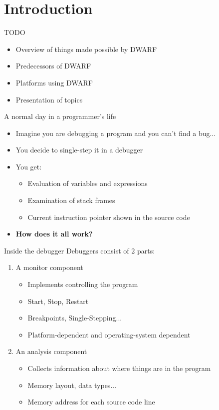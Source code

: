 
\section{Introduction}


\begin{frame}{TODO}
\begin{itemize}
\item Overview of things made possible by DWARF
\item Predecessors of DWARF
\item Platforms using DWARF
\item Presentation of topics
\end{itemize}
\end{frame}


\begin{frame}{A normal day in a programmer's life}
\begin{itemize}
\item Imagine you are debugging a program and you can't find a bug...
\item You decide to single-step it in a \alert{debugger}
\item You get:
	\begin{itemize}
	\item Evaluation of variables and expressions
	\item Examination of stack frames
	\item Current instruction pointer shown in the source code
	\end{itemize}
\pause
\item \textbf{How does it all work?}
\end{itemize}
\end{frame}


\begin{frame}{Inside the debugger}
Debuggers consist of 2 parts:
\begin{enumerate}
\item A \alert{monitor} component
	\begin{itemize}
	\normalsize
	\item Implements controlling the program
	\item Start, Stop, Restart
	\item \alert{Breakpoints}, Single-Stepping...
	\item Platform-dependent and operating-system dependent
	\end{itemize}
\item An \alert{analysis} component
	\begin{itemize}
	\normalsize
	\item Collects information about where things are in the program
	\item Memory layout, data types...
	\item Memory address for each source code line
	\end{itemize}
\end{enumerate}
\end{frame}


